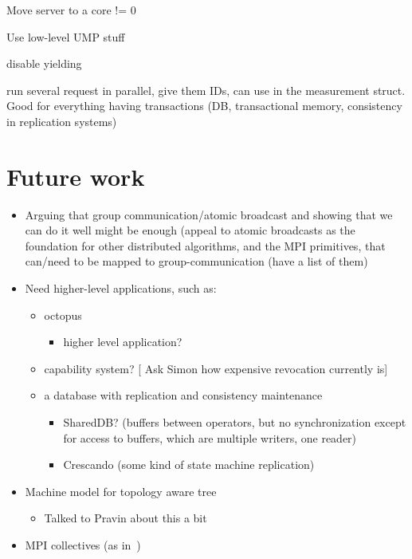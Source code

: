 \documentclass{article}
\newcommand{\stefan}[1]{
  {\color{skRed}[{\color{red}{SK}} #1]}}
\begin{document}
\begin{itemize}
\item Move server to a core != 0
\item Use low-level UMP stuff
{
\renewcommand{\labelitemi}{\checkmark}
\item disable yielding
}
\item run several request in parallel, give them IDs, can use in the
  measurement struct. Good for everything having transactions (DB,
  transactional memory, consistency in replication systems)
\end{itemize}

\section{Future work}

\begin{itemize}
\item Arguing that group communication/atomic broadcast and showing
  that we can do it well might be enough (appeal to atomic broadcasts
  as the foundation for other distributed algorithms, and the MPI
  primitives, that can/need to be mapped to group-communication (have
  a list of them) 
\item Need higher-level applications, such as:
  \begin{itemize}
  \item octopus
    \begin{itemize}
    \item higher level application?
    \end{itemize}
  \item capability system? \stefan{Ask Simon how expensive revocation
      currently is}
  \item a database with replication and consistency maintenance
    \begin{itemize}
    \item SharedDB? (buffers between operators, but no synchronization
      except for access to buffers, which are multiple writers, one
      reader)
    \item Crescando (some kind of state machine replication)
    \end{itemize}
  \end{itemize}
\item Machine model for topology aware tree
  \begin{itemize}
  \item Talked to Pravin about this a bit
  \end{itemize}
\item MPI collectives (as in~\cite{Tu2008})
\end{itemize}

\newpage



\label{LastPage}
\end{document}

